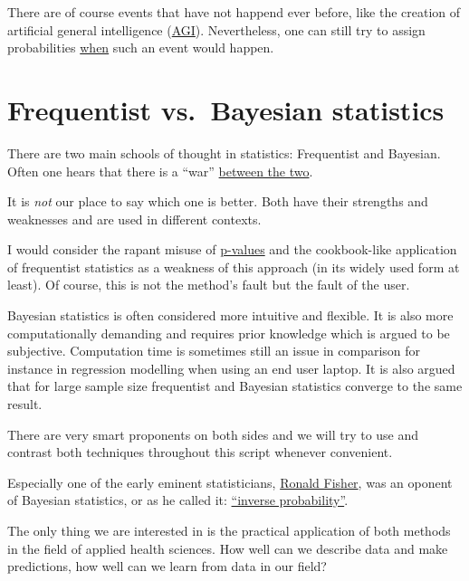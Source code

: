 \documentclass[
]{book}
\begin{document}
There are of course events that have not happend ever before, like the creation of artificial general intelligence (\href{https://en.wikipedia.org/wiki/Artificial_general_intelligence}{AGI}).
Nevertheless, one can still try to assign probabilities \href{https://research.aimultiple.com/artificial-general-intelligence-singularity-timing/}{when} such an event would happen.

\section{Frequentist vs.~Bayesian statistics}\label{frequentist-vs.-bayesian-statistics}

There are two main schools of thought in statistics: Frequentist and Bayesian. Often one hears that there is a ``war'' \href{https://www.youtube.com/watch?v=8wVq5aGzSqY&t=22s&ab_channel=VeryNormal}{between the two}.

It is \emph{not} our place to say which one is better. Both have their strengths and weaknesses and are used in different contexts.

I would consider the rapant misuse of \href{https://www.sciencedirect.com/science/article/abs/pii/S0037196308000620?via\%3Dihub}{p-values} and the
cookbook-like application of frequentist statistics as a weakness of this approach (in its widely used form at least).
Of course, this is not the method's fault but the fault of the user.

Bayesian statistics is often considered more intuitive and flexible. It is also more computationally demanding and requires prior knowledge which is argued to be subjective.
Computation time is sometimes still an issue in comparison for instance in regression modelling when using an end user laptop.
It is also argued that for large sample size frequentist and Bayesian statistics converge to the same result.

There are very smart proponents on both sides and we will try to use and contrast both techniques throughout this script whenever convenient.

Especially one of the early eminent statisticians, \href{https://en.wikipedia.org/wiki/Ronald_Fisher}{Ronald Fisher}, was an oponent of Bayesian statistics,
or as he called it: \href{https://errorstatistics.com/wp-content/uploads/2016/02/fisher-1930-inverse-probability.pdf}{``inverse probability''}.

The only thing we are interested in is the practical application of both methods in the field of applied health sciences.
How well can we describe data and make predictions, how well can we learn from data in our field?
\end{document}
